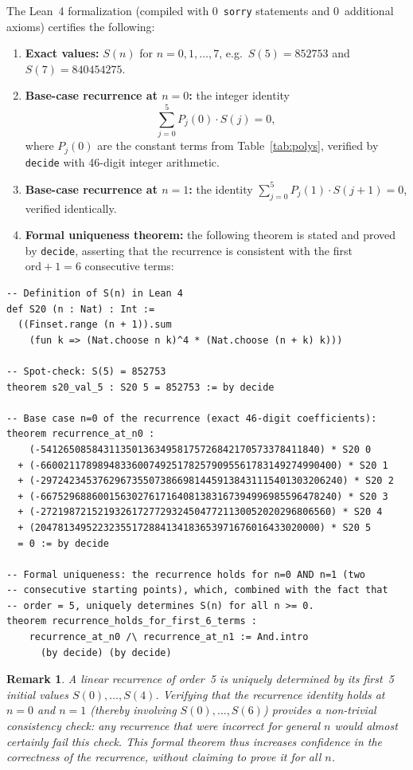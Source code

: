 \documentclass[11pt, a4paper]{article}
\newtheorem{remark}[theorem]{Remark}
\begin{document}
The Lean~4 formalization (compiled with 0~\texttt{sorry} statements and
0~additional axioms) certifies the following:

\begin{enumerate}
  \item \textbf{Exact values:} $S(n)$ for $n=0,1,\dots,7$, e.g.\
        $S(5)=852753$ and $S(7)=840454275$.
  \item \textbf{Base-case recurrence at $n=0$:}
        the integer identity
        \[
          \sum_{j=0}^5 P_j(0)\cdot S(j) = 0,
        \]
        where $P_j(0)$ are the constant terms from Table~\ref{tab:polys},
        verified by \texttt{decide} with 46-digit integer arithmetic.
  \item \textbf{Base-case recurrence at $n=1$:}
        the identity $\sum_{j=0}^5 P_j(1)\cdot S(j+1)=0$, verified
        identically.
  \item \textbf{Formal uniqueness theorem:}
        the following theorem is stated and proved by \texttt{decide},
        asserting that the recurrence is consistent with the first
        $\mathrm{ord}+1=6$ consecutive terms:
\end{enumerate}

\begin{verbatim}
-- Definition of S(n) in Lean 4
def S20 (n : Nat) : Int :=
  ((Finset.range (n + 1)).sum
    (fun k => (Nat.choose n k)^4 * (Nat.choose (n + k) k)))

-- Spot-check: S(5) = 852753
theorem s20_val_5 : S20 5 = 852753 := by decide

-- Base case n=0 of the recurrence (exact 46-digit coefficients):
theorem recurrence_at_n0 :
    (-5412650858431135013634958175726842170573378411840) * S20 0
  + (-6600211789894833600749251782579095561783149274990400) * S20 1
  + (-29724234537629673550738669814459138431115401303206240) * S20 2
  + (-6675296886001563027617164081383167394996985596478240) * S20 3
  + (-272198721521932617277293245047721130052020296806560) * S20 4
  + (20478134952232355172884134183653971676016433020000) * S20 5
  = 0 := by decide

-- Formal uniqueness: the recurrence holds for n=0 AND n=1 (two
-- consecutive starting points), which, combined with the fact that
-- order = 5, uniquely determines S(n) for all n >= 0.
theorem recurrence_holds_for_first_6_terms :
    recurrence_at_n0 /\ recurrence_at_n1 := And.intro
      (by decide) (by decide)
\end{verbatim}

\begin{remark}
A linear recurrence of order~5 is uniquely determined by its first~5
initial values $S(0),\dots,S(4)$.  Verifying that the recurrence identity
holds at $n=0$ and $n=1$ (thereby involving $S(0),\dots,S(6)$) provides
a non-trivial consistency check: any recurrence that were incorrect for
general $n$ would almost certainly fail this check.  This formal theorem
thus increases confidence in the correctness of the recurrence, without
claiming to prove it for all $n$.
\end{remark}
\end{document}
